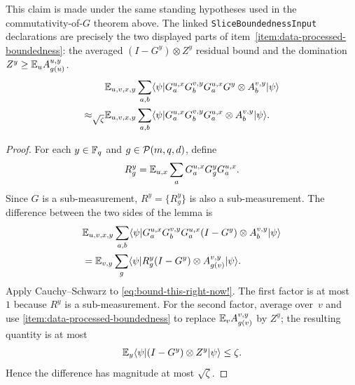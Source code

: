 \begin{lemma}\label{clm:g-comm-stability}
	\leanok
	This claim is made under the same standing hypotheses used in the
	commutativity-of-$G$ theorem above.  The linked
	\texttt{SliceBoundednessInput} declarations are precisely the two displayed
	parts of item~\ref{item:data-processed-boundedness}: the averaged
	\((I-G^y)\otimes Z^y\) residual bound and the domination
	\(Z^y\ge \mathbb{E}_u A^{u,y}_{g(u)}\).
	\begin{align}
		                       & \mathbb{E}_{u,v,x,y} \sum_{a,b}
		\langle \psi \rvert G_a^{u,x} G_b^{v,y} G_a^{u,x} G^y \otimes A_b^{v,y} \lvert \psi \rangle
		\label{eq:g-comm-stab1}                          \\
		\approx_{\sqrt{\zeta}} &
		\mathbb{E}_{u,v,x,y} \sum_{a,b}
		\langle \psi \rvert G_a^{u,x} G_b^{v,y} G_a^{u,x} \otimes A_b^{v,y} \lvert \psi \rangle.
		\nonumber
	\end{align}
\end{lemma}
\begin{proof}
	\leanok
	For each $y \in \mathbb{F}_q$ and $g \in \mathcal{P}(m,q,d)$, define
	\[
		R_g^y = \mathbb{E}_{u,x} \sum_a G_a^{u,x} G_g^y G_a^{u,x}.
	\]
	Since $G$ is a sub-measurement, $R^y=\{R_g^y\}$ is also a sub-measurement. The difference between the two sides of the lemma is
	\begin{align}
		 & \mathbb{E}_{u,v,x,y} \sum_{a,b}
		\langle \psi \rvert G_a^{u,x} G_b^{v,y} G_a^{u,x} (I-G^y) \otimes A_b^{v,y} \lvert \psi \rangle\nonumber \\
		 & = \mathbb{E}_{v,y} \sum_g
		\langle \psi \rvert R_g^y (I-G^y) \otimes A_{g(v)}^{v,y} \lvert \psi \rangle.
		\label{eq:bound-this-right-now!}
	\end{align}
	Apply Cauchy--Schwarz to \ref{eq:bound-this-right-now!}. The first factor is at most~$1$ because $R^y$ is a sub-measurement. For the second factor, average over~$v$ and use \ref{item:data-processed-boundedness} to replace $\mathbb{E}_v A_{g(v)}^{v,y}$ by $Z^y$; the resulting quantity is at most
	\[
		\mathbb{E}_y \langle \psi \rvert (I-G^y) \otimes Z^y \lvert \psi \rangle \le \zeta.
	\]
	Hence the difference has magnitude at most $\sqrt{\zeta}$.
\end{proof}

